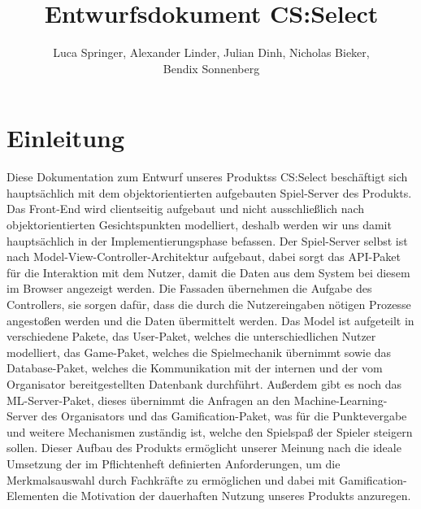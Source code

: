\documentclass[a4paper]{scrreprt}
\begin{document}
	\title{Entwurfsdokument CS:Select}
	\author{Luca Springer, Alexander Linder, Julian Dinh, Nicholas Bieker,\\ Bendix Sonnenberg}
	\maketitle

	\tableofcontents


	\chapter{Einleitung}
	Diese Dokumentation zum Entwurf unseres Produktss CS:Select beschäftigt sich hauptsächlich mit dem objektorientierten aufgebauten Spiel-Server des Produkts. Das Front-End wird clientseitig aufgebaut und nicht ausschließlich nach objektorientierten Gesichtspunkten modelliert, deshalb werden wir uns damit hauptsächlich in der Implementierungsphase befassen.
	\newline
	\newline
	Der Spiel-Server selbst ist nach Model-View-Controller-Architektur aufgebaut, dabei sorgt das API-Paket für die Interaktion mit dem Nutzer, damit die Daten aus dem System bei diesem im Browser angezeigt werden. Die Fassaden übernehmen die Aufgabe des Controllers, sie sorgen dafür, dass die durch die Nutzereingaben nötigen Prozesse angestoßen werden und die Daten übermittelt werden. Das Model ist aufgeteilt in verschiedene Pakete, das User-Paket, welches die unterschiedlichen Nutzer modelliert, das Game-Paket, welches die Spielmechanik übernimmt sowie das Database-Paket, welches die Kommunikation mit der internen und der vom Organisator bereitgestellten Datenbank durchführt. Außerdem gibt es noch das ML-Server-Paket, dieses übernimmt die Anfragen an den Machine-Learning-Server des Organisators und das Gamification-Paket, was für die Punktevergabe und weitere Mechanismen zuständig ist, welche den Spielspaß der Spieler steigern sollen.
	\newline
	\newline
	Dieser Aufbau des Produkts ermöglicht unserer Meinung nach die ideale Umsetzung der im Pflichtenheft definierten Anforderungen, um die Merkmalsauswahl durch Fachkräfte zu ermöglichen und dabei mit Gamification-Elementen die Motivation der dauerhaften Nutzung unseres Produkts anzuregen.
\end{document}
